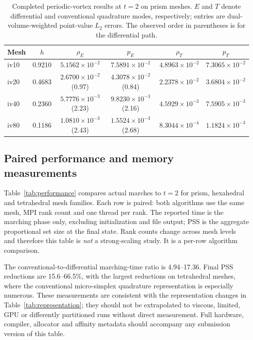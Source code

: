 \documentclass[11pt]{article}
\begin{document}
\begin{table}[t]
\centering
\caption{Completed periodic-vortex results at $t=2$ on prism meshes.  $E$ and $T$ denote differential and conventional quadrature modes, respectively; entries are dual-volume-weighted point-value $L_2$ errors.  The observed order in parentheses is for the differential path.}
\label{tab:vortex-accuracy}
\small
\begin{tabular}{lccccc}
\toprule
Mesh & $h$ & $\rho_E$ & $p_E$ & $\rho_T$ & $p_T$ \\
\midrule
iv10 & 0.9210 & $5.1562\times10^{-2}$ & $7.5891\times10^{-2}$ & $4.8963\times10^{-2}$ & $7.3065\times10^{-2}$ \\
iv20 & 0.4683 & $2.6700\times10^{-2}$ (0.97) & $4.3078\times10^{-2}$ (0.84) & $2.2378\times10^{-2}$ & $3.6804\times10^{-2}$ \\
iv40 & 0.2360 & $5.7776\times10^{-3}$ (2.23) & $9.8230\times10^{-3}$ (2.16) & $4.5929\times10^{-3}$ & $7.5905\times10^{-3}$ \\
iv80 & 0.1186 & $1.0810\times10^{-3}$ (2.43) & $1.5524\times10^{-3}$ (2.68) & $8.3044\times10^{-4}$ & $1.1824\times10^{-3}$ \\
\bottomrule
\end{tabular}
\end{table}

\subsection{Paired performance and memory measurements}\label{sec:performance}

Table~\ref{tab:performance} compares actual marches to $t=2$ for prism, hexahedral and tetrahedral mesh families.  Each row is paired: both algorithms use the same mesh, MPI rank count and one thread per rank.  The reported time is the marching phase only, excluding initialization and file output; PSS is the aggregate proportional set size at the final state.  Rank counts change across mesh levels and therefore this table is \emph{not} a strong-scaling study.  It is a per-row algorithm comparison.

The conventional-to-differential marching-time ratio is 4.94--17.36.  Final PSS reductions are 15.6--66.5\%, with the largest reductions on tetrahedral meshes, where the conventional micro-simplex quadrature representation is especially numerous.  These measurements are consistent with the representation changes in Table~\ref{tab:representation}; they should not be extrapolated to viscous, limited, GPU or differently partitioned runs without direct measurement.  Full hardware, compiler, allocator and affinity metadata should accompany any submission version of this table.
\end{document}
